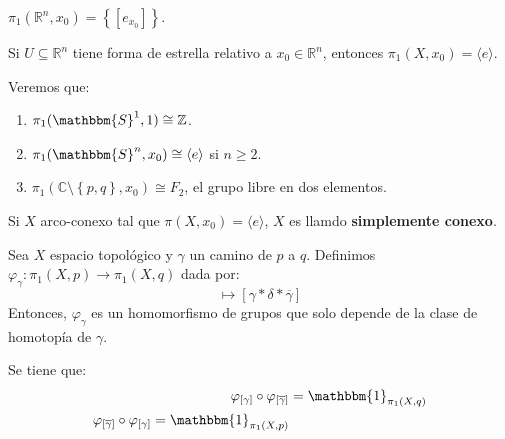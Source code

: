 \documentclass[12pt]{report}
\newcounter{it}
\theoremstyle{largebreak}
\newcommand\cf[3]{\ensuremath{#1:#2\rightarrow#3}}
\newcommand{\bbm}[1]{\ensuremath{\mathbbm{#1}}}
\newcommand{\gen}[1]{\ensuremath{\langle#1\rangle}}
\begin{document}
    \begin{exa}
        $\pi_1(\mathbb{R}^n,x_0)=\left\{[e_{ x_0}] \right\}$.
    \end{exa}

    \begin{exa}
        Si $U\subseteq\mathbb{R}^n$ tiene forma de estrella relativo a $x_0\in\mathbb{R}^n$, entonces $\pi_1(X,x_0)=\gen{e}$.
    \end{exa}
    
    \begin{obs}
        Veremos que:
        \begin{enumerate}[label = \textit{(\alph*)}]
            \item $\pi_1(\bbm{S}^1,1)\cong\mathbb{Z}$.
            \item $\pi_1(\bbm{S}^n,x_0)\cong\gen{e}$ si $n\geq2$.
            \item $\pi_1(\mathbb{C}\setminus\left\{p,q\right\},x_0)\cong F_2$, el grupo libre en dos elementos.
        \end{enumerate}
    \end{obs}

    \begin{mydef}
        Si $X$ arco-conexo tal que $\pi(X,x_0)=\gen{e}$, $X$ es llamdo \textbf{simplemente conexo}.
    \end{mydef}

    \begin{lema}
        Sea $X$ espacio topológico y $\gamma$ un camino de $p$ a $q$. Definimos $\cf{\varphi_\gamma}{\pi_1(X,p)}{\pi_1(X,q)}$ dada por:
        \begin{equation*}
            [\delta]\mapsto[\gamma*\delta*\overline{\gamma}]
        \end{equation*}
        Entonces, $\varphi_\gamma$ es un homomorfismo de grupos que solo depende de la clase de homotopía de $\gamma$.
    \end{lema}

    \begin{lema}
        Se tiene que:
        \begin{equation*}
            \begin{split}
                \varphi_{[\gamma]}\circ\varphi_{[\overline{\gamma}]}&=\bbm{1}_{\pi_1(X,q)}\\
                \varphi_{[\overline{\gamma}]}\circ\varphi_{[\gamma]}=\bbm{1}_{\pi_1(X,p)}
            \end{split}
        \end{equation*}
    \end{lema}
\end{document}
